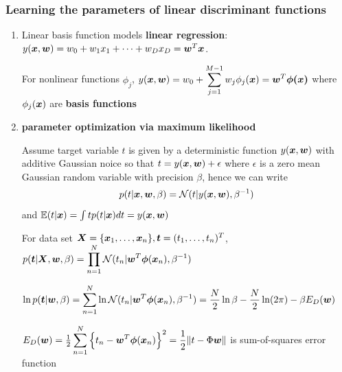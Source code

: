 \documentclass[11pt]{article}
\begin{document}
\subsubsection{Learning the parameters of linear discriminant functions}
\label{sec:org615308f}
\begin{enumerate}
\item Linear basis function models
\label{sec:org94224f4}
\textbf{linear regression}:
\(y(\boldsymbol{x},\boldsymbol{w})=w_0+w_1x_1+\dots+w_Dx_D=\boldsymbol{w}^T\boldsymbol{x}\).

For nonlinear functions \(\phi_j\),
\(y(\boldsymbol{x},\boldsymbol{w})=w_0+\displaystyle\sum_{j=1}^{M-1}
     w_j\phi_j(\boldsymbol{x})=\boldsymbol{w}^T\boldsymbol{\phi(\boldsymbol{x})}\) where \(\phi_j(\boldsymbol{x})\) are
\textbf{basis functions} 
\item \textbf{parameter optimization via maximum likelihood}
\label{sec:org331bad0}

Assume target variable \(t\) is given by a deterministic function
\(y(\boldsymbol{x},\boldsymbol{w})\) with additive Gaussian noice so that
\(t=y(\boldsymbol{x},\boldsymbol{w})+\epsilon\) where \(\epsilon\) is a zero mean Gaussian
random variable with precision \(\beta\), hence we can write
\begin{equation*}
p(t|\boldsymbol{x},\boldsymbol{w},\beta)=\mathcal{N}(t|y(\boldsymbol{x},\boldsymbol{w}),\beta^{-1})
\end{equation*}
and \(\mathbb{E}(t|\boldsymbol{x})=\int tp(t|\boldsymbol{x})dt=y(\boldsymbol{x},\boldsymbol{w})\)

For data set \(\boldsymbol{X}=\{\boldsymbol{x}_1,\dots,\boldsymbol{x}_n\},\boldsymbol{t}=(t_1,\dots,t_n)^T\),
\(p(\boldsymbol{t}|\boldsymbol{X},\boldsymbol{w},\beta)=\displaystyle\prod_{n=1}^N\mathcal{N}(t_n|
     \boldsymbol{w}^T\boldsymbol{\phi}(\boldsymbol{x}_n),\beta^{-1})\)

\(\ln p(\boldsymbol{t}|\boldsymbol{w},\beta)=\displaystyle\sum_{n=1}^N\ln\mathcal{N}(t_n|
     \boldsymbol{w}^T\boldsymbol{\phi}(\boldsymbol{x}_n),\beta^{-1})=\frac{N}{2}\ln\beta-\frac{N}{2}\ln(2\pi)-
     \beta E_D(\boldsymbol{w})\)

\(E_D(\boldsymbol{w})=\frac{1}{2}\displaystyle\sum_{n=1}^N
     \left\{t_n-\boldsymbol{w}^T\boldsymbol{\phi}(\boldsymbol{x}_n)\right\}^2=
     \frac{1}{2}\norm{t-\Phi\boldsymbol{w}}\) is sum-of-squares error function


\end{enumerate}
\end{document}
